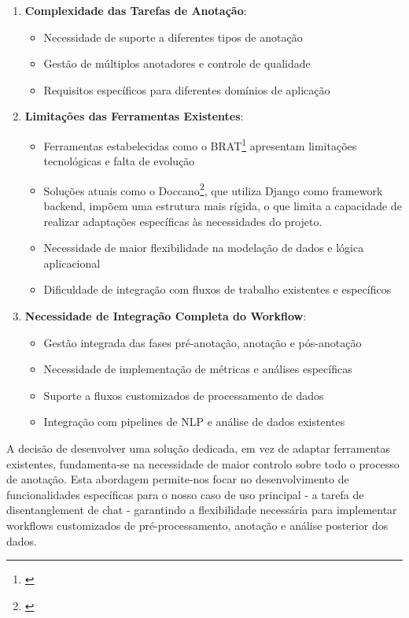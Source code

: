 \begin{enumerate}
    \item \textbf{Complexidade das Tarefas de Anotação}:
    \begin{itemize}
        \item Necessidade de suporte a diferentes tipos de anotação
        \item Gestão de múltiplos anotadores e controle de qualidade
        \item Requisitos específicos para diferentes domínios de aplicação
    \end{itemize}

    \item \textbf{Limitações das Ferramentas Existentes}:
    \begin{itemize}
        \item Ferramentas estabelecidas como o BRAT\footnote{\cite{brat-repo,brat-about}} apresentam limitações tecnológicas e falta de evolução
        \item Soluções atuais como o Doccano\footnote{\cite{doccano-repo,doccano-docs}}, que utiliza Django como framework backend, impõem uma estrutura mais rígida, o que limita a capacidade de realizar adaptações específicas às necessidades do projeto.
        \item Necessidade de maior flexibilidade na modelação de dados e lógica aplicacional
        \item Dificuldade de integração com fluxos de trabalho existentes e específicos
    \end{itemize}

    \item \textbf{Necessidade de Integração Completa do Workflow}:
    \begin{itemize}
        \item Gestão integrada das fases pré-anotação, anotação e pós-anotação
        \item Necessidade de implementação de métricas e análises específicas
        \item Suporte a fluxos customizados de processamento de dados
        \item Integração com pipelines de NLP e análise de dados existentes
    \end{itemize}
\end{enumerate}

A decisão de desenvolver uma solução dedicada, em vez de adaptar ferramentas existentes, fundamenta-se na necessidade de maior controlo sobre todo o processo de anotação. Esta abordagem permite-nos focar no desenvolvimento de funcionalidades específicas para o nosso caso de uso principal - a tarefa de disentanglement de chat - garantindo a flexibilidade necessária para implementar workflows customizados de pré-processamento, anotação e análise posterior dos dados.


